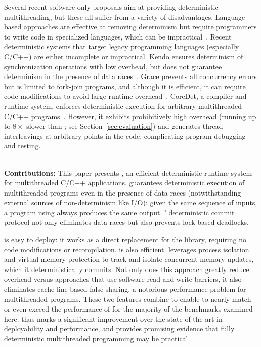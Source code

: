 
\label{chapter:dthreads}

Several recent software-only proposals aim at providing
deterministic multithreading, but these all suffer from a variety of disadvantages. Language-based approaches are effective at removing determinism but require programmers to write code in specialized languages, which can be impractical~\cite{Bocchino:2009:TES:1640089.1640097,Burckhardt:2010:CPR:1869459.1869515,Simpson:1999:SEE:330346.330357}. Recent deterministic systems that target legacy programming languages
(especially C/C++) are either incomplete or impractical. Kendo ensures determinism of synchronization operations with low overhead, but does not guarantee determinism in the presence of data races~\cite{1508256}. Grace prevents all concurrency errors but is limited to fork-join programs, and although it is efficient, it can require code modifications to avoid large runtime overhead~\cite{grace}. CoreDet, a compiler and runtime system, enforces deterministic execution for arbitrary multithreaded C/C++ programs~\cite{Bergan:2010:CCR:1736020.1736029}. However, it exhibits prohibitively high overhead (running up to $8\times$ slower than \pthreads{}; see Section~\ref{sec:evaluation}) and generates thread interleavings at arbitrary points in the code, complicating program debugging and testing.

\hspace{1em} \\
\noindent
\textbf{Contributions:}
This paper presents \textbf{\dthreads{}}, an efficient deterministic runtime system for multithreaded C/C++ applications. \dthreads{} guarantees deterministic execution of multithreaded programs even in the presence of data races (notwithstanding external sources of non-determinism
like I/O): given the same sequence of inputs, a program
using \dthreads{} always produces the same output. \dthreads{}'
deterministic commit protocol not only eliminates data races but also prevents lock-based deadlocks.

\dthreads{} is easy to deploy: it works as a direct replacement for the \pthreads{} library, requiring no code modifications or
recompilation. \dthreads{} is also efficient. \dthreads{} leverages process isolation and virtual memory protection to track and isolate concurrent memory updates, which it deterministically commits. Not only does this approach greatly reduce overhead versus approaches that use software read and write barriers, it also eliminates cache-line based false sharing, a notorious performance problem for multithreaded
programs. These two features combine to enable \dthreads{} to nearly match or even exceed the performance of \pthreads{} for the majority of the benchmarks examined here. \dthreads{} thus marks a significant improvement over the state of the art in deployability and performance, and provides promising evidence that fully deterministic multithreaded programming may be practical.

